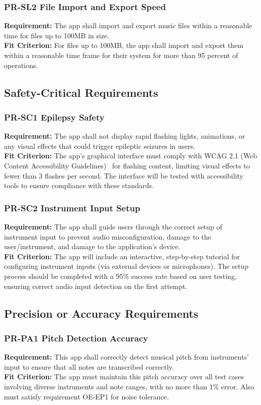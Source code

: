 \documentclass[12pt]{article}
\begin{document}
\subsubsection*{PR-SL2 File Import and Export Speed}
\textbf{Requirement:} The app shall import and export music files within a reasonable time for files up to 100MB in size.\\
\textbf{Fit Criterion:} For files up to 100MB, the app shall import and export them within a reasonable time frame for their system for more than 95 percent of operations.

\subsection{Safety-Critical Requirements}
\subsubsection*{PR-SC1 Epilepsy Safety}
\textbf{Requirement:} The app shall not display rapid flashing lights, animations, or any visual effects that could trigger epileptic seizures in users.\\
\textbf{Fit Criterion:} The app’s graphical interface must comply with WCAG 2.1 (Web Content Accessibility Guidelines)~\cite{WCAG-Seizures} for flashing content, limiting visual effects to fewer than 3 flashes per second. The interface will be tested with accessibility tools to ensure compliance with these standards.
\subsubsection*{PR-SC2 Instrument Input Setup}
\textbf{Requirement:} The app shall guide users through the correct setup of instrument input to prevent audio misconfiguration, damage to the user/instrument, and damage to the application’s device.\\
\textbf{Fit Criterion:} The app will include an interactive, step-by-step tutorial for configuring instrument inputs (via external devices or microphones). The setup process should be completed with a 95\% success rate based on user testing, ensuring correct audio input detection on the first attempt.

\subsection{Precision or Accuracy Requirements}
\subsubsection*{PR-PA1 Pitch Detection Accuracy}
\textbf{Requirement:} This app shall correctly detect musical pitch from instruments' input to ensure that all notes are transcribed correctly.\\
\textbf{Fit Criterion:} The app must maintain this pitch accuracy over all test cases involving diverse instruments and note ranges, with no more than 1\% error. Also must satisfy requirement OE-EP1 for noise tolerance.
\end{document}
